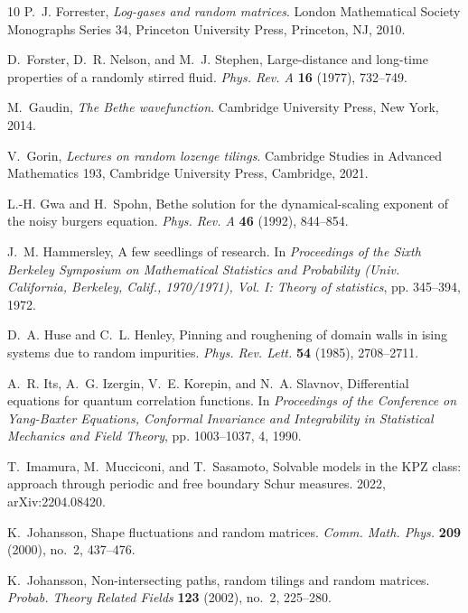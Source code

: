 \documentclass[10pt]{article}
\theoremstyle{plain}
\theoremstyle{definition}
\numberwithin{equation}{section}
\begin{document}
\begin{thebibliography}{10}
P.~J. Forrester, \emph{Log-gases and random matrices}. London Mathematical
  Society Monographs Series 34, Princeton University Press, Princeton, NJ,
  2010.

D.~Forster, D.~R. Nelson, and M.~J. Stephen, Large-distance and long-time
  properties of a randomly stirred fluid. \emph{Phys. Rev. A} \textbf{16}
  (1977), 732--749.

M.~Gaudin, \emph{The {B}ethe wavefunction}. Cambridge University Press, New
  York, 2014.

V.~Gorin, \emph{Lectures on random lozenge tilings}. Cambridge Studies in
  Advanced Mathematics 193, Cambridge University Press, Cambridge, 2021.

L.-H. Gwa and H.~Spohn, Bethe solution for the dynamical-scaling exponent of
  the noisy burgers equation. \emph{Phys. Rev. A} \textbf{46} (1992), 844--854.

J.~M. Hammersley, A few seedlings of research. In \emph{Proceedings of the
  {S}ixth {B}erkeley {S}ymposium on {M}athematical {S}tatistics and
  {P}robability ({U}niv. {C}alifornia, {B}erkeley, {C}alif., 1970/1971), {V}ol.
  {I}: {T}heory of statistics}, pp. 345--394, 1972.

D.~A. Huse and C.~L. Henley, Pinning and roughening of domain walls in ising
  systems due to random impurities. \emph{Phys. Rev. Lett.} \textbf{54} (1985),
  2708--2711.

A.~R. Its, A.~G. Izergin, V.~E. Korepin, and N.~A. Slavnov, Differential
  equations for quantum correlation functions. In \emph{Proceedings of the
  {C}onference on {Y}ang-{B}axter {E}quations, {C}onformal {I}nvariance and
  {I}ntegrability in {S}tatistical {M}echanics and {F}ield {T}heory}, pp.
  1003--1037, 4, 1990.

T.~Imamura, M.~Mucciconi, and T.~Sasamoto, Solvable models in the {KPZ} class: approach through periodic and free boundary {S}chur measures. 2022, arXiv:2204.08420.
  
K.~Johansson, Shape fluctuations and random matrices. \emph{Comm. Math. Phys.}
  \textbf{209} (2000), no.~2, 437--476.

K.~Johansson, Non-intersecting paths, random tilings and random matrices.
  \emph{Probab. Theory Related Fields} \textbf{123} (2002), no.~2, 225--280.


\end{thebibliography}
\end{document}
